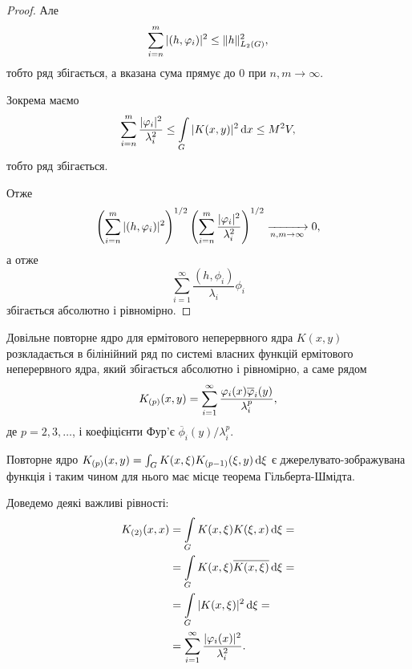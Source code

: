 \begin{proof}
	Але
	\begin{equation}
		\displaystyle\sum\limits_{i=n}^m |(h, \varphi_i)|^2 \le \|h\|_{L_2(G)}^2,
	\end{equation}
	тобто ряд збігається, а вказана сума прямує до 0 при $n, m \to \infty$.

	Зокрема маємо
	\begin{equation}
		\displaystyle\sum\limits_{i=n}^m \dfrac{|\varphi_i|^2}{\lambda_i^2} \le \displaystyle\int\limits_G |K(x, y)|^2 \mathop{}\!\mathrm{d} x \le M^2 V, 
	\end{equation}
	тобто ряд збігається. \medskip

	Отже
	\begin{equation}
		\left(\displaystyle\sum\limits_{i=n}^m |(h, \varphi_i)|^2\right)^{1/2} \left(\displaystyle\sum\limits_{i=n}^m \dfrac{|\varphi_i|^2}{\lambda_i^2}\right)^{1/2} \xrightarrow[n, m \to \infty]{} 0,
	\end{equation}
	а отже
	\begin{equation}
		\sum_{i=1}^\infty \frac{(h, \phi_i)}{\lambda_i} \phi_i
	\end{equation}
	збігається абсолютно і рівномірно.
\end{proof}

\begin{corollary}
	\label{corollary:2.4.10}
	Довільне повторне ядро для ермітового неперервного ядра $K(x ,y)$ розкладається в білінійний ряд по системі власних функцій ермітового неперервного ядра, який збігається абсолютно і рівномірно, а саме рядом
	\begin{equation}
		K_{(p)}(x, y) = \displaystyle\sum\limits_{i = 1}^\infty \dfrac{\varphi_i(x) \overline {\varphi}_i(y)}{\lambda_i^p},
	\end{equation}
	де $p = 2, 3, \ldots$, і коефіцієнти Фур'є  $\overline \phi_i(y) / \lambda_i^p$.
\end{corollary}

Повторне ядро $K_{(p)}(x,y) = \int_G K(x, \xi) K_{(p - 1)} (\xi, y) \mathop{}\!\mathrm{d} \xi$ є джерелувато-зображувана функція і таким чином для нього має місце теорема Гільберта-Шмідта. \medskip

Доведемо деякі важливі рівності:
\begin{equation}
	\begin{aligned}
	K_{(2)} (x, x) &= \displaystyle\int\limits_G K(x, \xi) K(\xi, x) \mathop{}\!\mathrm{d} \xi = \\
	&= \displaystyle\int\limits_G K(x, \xi) \overline {K(x, \xi)} \mathop{}\!\mathrm{d} \xi = \\
	&= \displaystyle\int\limits_G |K(x, \xi)|^2 \mathop{}\!\mathrm{d} \xi = \\
	&= \displaystyle\sum\limits_{i = 1}^\infty \dfrac{|\varphi_i(x)|^2}{\lambda_i^2}.
	\end{aligned}
\end{equation}

